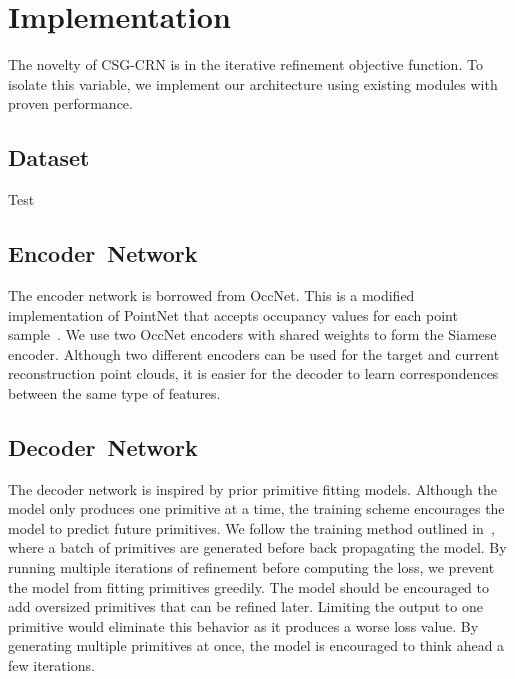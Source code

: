 
\chapter{Implementation}
\label{chap:implementation}

The novelty of CSG-CRN is in the iterative refinement objective function. To isolate this variable, we implement our architecture using existing modules with proven performance.


\section{Dataset}
\label{sec:dataset}

Test


\section{Encoder~Network}
\label{sec:encoder_network}

The encoder network is borrowed from OccNet. This is a modified implementation of PointNet that accepts occupancy values for each point sample~\cite{Mescheder2019}. We use two OccNet encoders with shared weights to form the Siamese encoder. Although two different encoders can be used for the target and current reconstruction point clouds, it is easier for the decoder to learn correspondences between the same type of features.


\section{Decoder~Network}
\label{sec:decoder_network}

The decoder network is inspired by prior primitive fitting models. Although the model only produces one primitive at a time, the training scheme encourages the model to predict future primitives. We follow the training method outlined in~\cite{Kleineberg2020}, where a batch of primitives are generated before back propagating the model. By running multiple iterations of refinement before computing the loss, we prevent the model from fitting primitives greedily. The model should be encouraged to add oversized primitives that can be refined later. Limiting the output to one primitive would eliminate this behavior as it produces a worse loss value. By generating multiple primitives at once, the model is encouraged to think ahead a few iterations.


